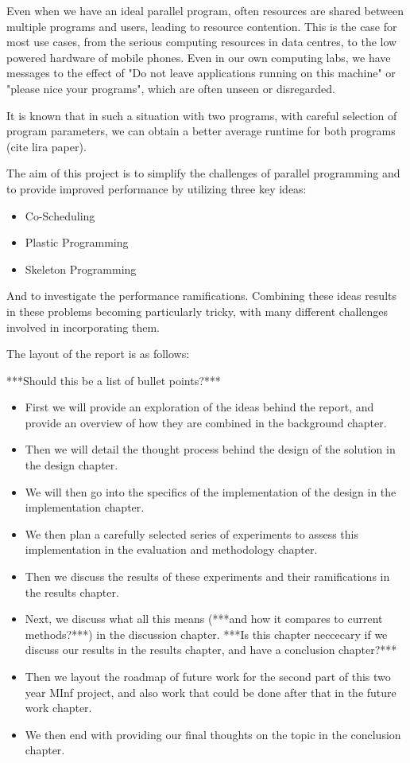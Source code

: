 Even when we have an ideal parallel program, often resources are shared between multiple programs and users, leading to resource contention. This is the case for most use cases, from the serious computing resources in data centres, to the low powered hardware of mobile phones. Even in our own computing labs, we have messages to the effect of "Do not leave applications running on this machine" or "please nice your programs", which are often unseen or disregarded.

It is known that in such a situation with two programs, with careful selection of program parameters, we can obtain a better average runtime for both programs (cite lira paper).

The aim of this project is to simplify the challenges of parallel programming and to provide improved performance by utilizing three key ideas:

\begin{itemize}
	\item Co-Scheduling
	\item Plastic Programming
	\item Skeleton Programming
\end{itemize}

And to investigate the performance ramifications. Combining these ideas results in these problems becoming particularly tricky, with many different challenges involved in incorporating them.

The layout of the report is as follows:

***Should this be a list of bullet points?***

\begin{itemize}
	\item First we will provide an exploration of the ideas behind the report, and provide an overview of how they are combined in the background chapter.
	\item Then we will detail the thought process behind the design of the solution in the design chapter.
	\item We will then go into the specifics of the implementation of the design in the implementation chapter.
	\item We then plan a carefully selected series of experiments to assess this implementation in the evaluation and methodology chapter.
	\item Then we discuss the results of these experiments and their ramifications in the results chapter.
	\item Next, we discuss what all this means (***and how it compares to current methods?***) in the discussion chapter. ***Is this chapter neccecary if we discuss our results in the results chapter, and have a conclusion chapter?***
	\item Then we layout the roadmap of future work for the second part of this two year MInf project, and also work that could be done after that in the future work chapter.
	\item We then end with providing our final thoughts on the topic in the conclusion chapter.
\end{itemize}